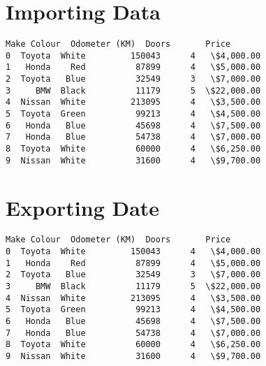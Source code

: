 \documentclass[11pt]{article}
\begin{document}
    \hypertarget{importing-data}{%
\section{\texorpdfstring{\textbf{Importing
Data}}{Importing Data}}\label{importing-data}}

            \begin{tcolorbox}[breakable, size=fbox, boxrule=.5pt, pad at break*=1mm, opacityfill=0]
\begin{Verbatim}[commandchars=\\\{\}]
     Make Colour  Odometer (KM)  Doors       Price
0  Toyota  White         150043      4   \$4,000.00
1   Honda    Red          87899      4   \$5,000.00
2  Toyota   Blue          32549      3   \$7,000.00
3     BMW  Black          11179      5  \$22,000.00
4  Nissan  White         213095      4   \$3,500.00
5  Toyota  Green          99213      4   \$4,500.00
6   Honda   Blue          45698      4   \$7,500.00
7   Honda   Blue          54738      4   \$7,000.00
8  Toyota  White          60000      4   \$6,250.00
9  Nissan  White          31600      4   \$9,700.00
\end{Verbatim}
\end{tcolorbox}
        
    \hypertarget{exporting-date}{%
\section{\texorpdfstring{\textbf{Exporting
Date}}{Exporting Date}}\label{exporting-date}}

            \begin{tcolorbox}[breakable, size=fbox, boxrule=.5pt, pad at break*=1mm, opacityfill=0]
\begin{Verbatim}[commandchars=\\\{\}]
     Make Colour  Odometer (KM)  Doors       Price
0  Toyota  White         150043      4   \$4,000.00
1   Honda    Red          87899      4   \$5,000.00
2  Toyota   Blue          32549      3   \$7,000.00
3     BMW  Black          11179      5  \$22,000.00
4  Nissan  White         213095      4   \$3,500.00
5  Toyota  Green          99213      4   \$4,500.00
6   Honda   Blue          45698      4   \$7,500.00
7   Honda   Blue          54738      4   \$7,000.00
8  Toyota  White          60000      4   \$6,250.00
9  Nissan  White          31600      4   \$9,700.00
\end{Verbatim}
\end{tcolorbox}
        
\end{document}
